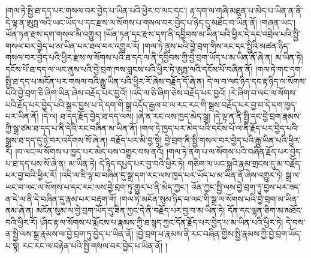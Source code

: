 །གལ་ཏེ་སྤྱི་ཐ་དད་པར་གསལ་བར་བྱེད་པ་ཡིན་པའི་ཕྱིར་བ་ལང་དང་། རྟ་དག་ལ་གཞི་མཐུན་པ་མེད་པ་ཡིན་ན་ནི་དེ་ལྟ་ན་ཨུཏྤ་ལའི་ཡང་ཡོད་པ་དང་རྫས་ལ་སོགས་པ་གསལ་བར་བྱེད་པ་ཉིད་དུ་མཐོང་བ་ཡིན་ནོ། །གཞན་ཡང་། ཡོན་ཏན་རྫས་དག་གསལ་མི་འགྱུར། །ཡོན་ཏན་དང་རྫས་དག་ནི་དབྱིབས་མ་ཡིན་པའི་ཕྱིར་དེ་དང་འབྲེལ་པའི་སྤྱི་གསལ་བར་བྱེད་པ་མ་ཡིན་པར་ཐལ་བར་འགྱུར་རོ། །གལ་ཏེ་ནུས་པའི་བྱེ་བྲག་གིས་རང་དང་སྤྱིའི་མཚན་ཉིད་གསལ་བར་བྱེད་པའི་ཕྱིར་རྫས་ལ་སོགས་པའི་ཐ་དད་ལ་ནི་དབྱིབས་ཀྱི་བྱེ་བྲག་ཡོད་པ་མ་ཡིན་ནོ་ཞེ་ན། མ་ཡིན་ཏེ། དངོས་པོ་ཐ་དད་ལ་ཡང་ནུས་པའི་བྱེ་བྲག་ཁས་བླངས་པའི་ཕྱིར་ཏེ་ཨུཏྤ་ལའི་དངོས་པོ་བཞིན་ནོ། །གལ་ཏེ་གང་དག་སྤྱི་ཐ་དད་པ་མངོན་པར་གསལ་བའི་རྒྱུ་ཡིན་པའི་ཕྱིར་རོ་ཞེས་བརྗོད་དོ་ཞེ་ན། དེ་ལ་བ་ལང་ཉིད་དང་རྟ་ཉིད་ལ་སོགས་པའི་བྱེ་བྲག་ཅི་ཞིག་ཡིན་ཞེས་བརྗོད་པར་བྱའོ། །འདི་ལ་ཅི་ཞིག་ཅེས་བརྗོད་པར་བྱའོ། །རེ་ཞིག་བ་ལང་ལ་སོགས་པའི་རྗོད་པར་བྱེད་པའི་སྒྲར་བྱས་པ་དེ་དག་གི་སྒྲ་འདོད་རྒྱལ་བ་ལ་རང་རང་གི་སྒྲས་བརྗོད་པར་བྱ་བ་དེ་དག་ཁྱད་པར་ཡིན་ནོ། །དེ་ལ། ཐ་དད་རྗོད་བྱེད་ཐ་དད་ལས། །ཞེ་ན་རང་ལས་ཁྱད་མེད་སྒྲ། །དེ་ལྟ་ན་ནི་སྤྱི་དང་བྱེ་བྲག་རྣམས་ཀྱི་སྒྲ་ཙམ་ཐ་དད་པ་ནི་དེའི་རང་བཞིན་མ་ཡིན་ནོ། །གལ་ཏེ་ཁྱད་པར་མེད་པའི་དངོས་པོ་ལ་ནི་རྗོད་པར་བྱེད་པའི་སྒྲས་ཐ་དད་དུ་ཉེ་བར་འདོགས་སོ་ཞེ་ན། བརྗོད་པར་མི་བྱ་སྟེ། བྱེ་བྲག་ནི་སྤྱི་གསལ་བར་བྱེད་པའི་རྒྱུ་ཡིན་པའི་ཕྱིར་རོ། །བ་ལང་ལ་སོགས་པ་ཁྱད་པར་མེད་པས་འགྱུར་བས་ནའོ། །གལ་ཏེ་ནག་པ་ལ་སོགས་པའི་བཞིན་རྗོད་པར་བྱེད་པ་ཐ་དད་པས་སོ་ཞེ་ན། མ་ཡིན་ཏེ། དེ་ཉིད་དཔྱད་པར་བྱ་བའི་ཕྱིར་ཏེ། གཅིག་ལ་ཡང་སྒྲའི་རྣམ་གྲངས་དུ་མ་བརྗོད་པར་བྱ་བའི་ཕྱིར་རོ། །འདི་ལ་ཇི་ལྟ་བ་བཞིན་དུ་སྒྲ་དག་རང་ལས་ཁྱད་པར་ཡོད་པ་མ་ཡིན་ནོ་ཞེས་འགྱུར་ཏེ། སྒྲ་ལ་ཡང་བ་ལང་ལ་སོགས་པ་དང་རང་ལས་བྱེ་བྲག་ཏུ་གྱུར་པ་ནི་མེད་ཀྱང་། འོན་ཀྱང་སྤྱི་ལས་བྱེ་བྲག་ཏུ་བྱས་པར་ཟད་ན་དེ་ལ་ནི་དེ་བཞིན་དུ་རྣམ་པར་བརྟག་གོ། །གལ་ཏེ་མངོན་སུམ་ཉིད་བ་ལང་གི་སྒྲ་ལ་སོགས་པའི་བྱེ་བྲག་མ་ཡིན་ནམ་ཞེ་ན། མངོན་སུམ་ལ་བྱེ་བྲག་ཡོད་དུ་ཟིན་ཀྱང་དེ་ནི་བརྗོད་པར་བྱ་བ་མ་ཡིན་ཏེ། དོན་དང་ལྷན་ཅིག་མ་མཐོང་བའི་ཕྱིར་རོ། །ཤིང་རྟ་ལ་སོགས་པ་རྨོངས་པ་རྣམས་ཀྱི་ཐ་སྙད་ཀྱང་དོན་རྗོད་པར་བྱེད་པ་མ་ཡིན་པའི་ཕྱིར་ཏེ། དེ་བས་ན་སྤྱི་ལས་སྒྲ་རྣམས་ལ་བྱེ་བྲག་ཏུ་བྱེད་པ་ཡིན་ནོ། །བྱེ་བྲག་པ་རྣམས་ནི་རང་བཞིན་གྱིས་སྤྱི་རྣམས་ཀྱི་བྱེ་བྲག་ཡོད་པ་སྟེ། རང་རང་ལ་བརྟེན་པའི་སྤྱི་གསལ་བར་བྱེད་པ་ཡིན་ནོ། །
